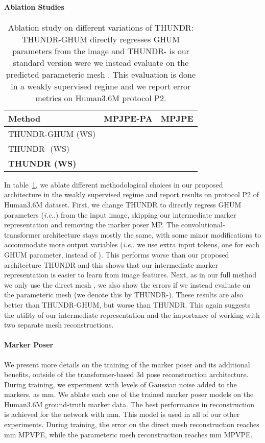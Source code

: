 \documentclass[10pt,twocolumn,letterpaper]{article}
\makeatletter
\DeclareRobustCommand\onedot{\futurelet\@let@token\@onedot}
\def\@onedot{\ifx\@let@token.\else.\null\fi\xspace}
\def\ie{\emph{i.e}\onedot} \def\Ie{\emph{I.e}\onedot}
\makeatother
\begin{document}
\paragraph{Ablation Studies}
\begin{table}[!htbp]
    \small
    \centering
    \begin{tabular}[t]{|l||r|r|}
    \hline
    \textbf{Method}  & {MPJPE-PA} & {MPJPE}\\ 
    \hline
    THUNDR-GHUM (WS) &  &  \\
    \hline
    THUNDR-{} (WS) &  &  \\
    \hline
    \textbf{THUNDR (WS)} &  &  \\
    \hline
    \end{tabular}
    \vspace{-3mm}

    \caption{\small Ablation study on different variations of THUNDR: THUNDR-GHUM directly regresses GHUM parameters from the image and THUNDR-{} is our standard version were we instead evaluate on the predicted parameteric mesh {}. This evaluation is done in a weakly supervised regime and we report error metrics on Human3.6M protocol P2. }
\label{tbl:ablation_ghum}
\end{table}
In table~\ref{tbl:ablation_ghum}, we ablate different methodological choices in our proposed architecture in the weakly supervised regime and report results on protocol P2 of Human3.6M dataset. First, we change THUNDR to directly regress GHUM parameters (\ie ) from the input image, skipping our intermediate marker representation and removing the marker poser MP. The convolutional-transformer architecture stays mostly the same, with some minor modifications to accommodate more output variables (\ie we use  extra input tokens, one for each GHUM parameter, instead of ). This performs worse than our proposed architecture THUNDR and this shows that our intermediate marker representation is easier to learn from image features. Next, as in our full method we only use the direct mesh , we also show the errors if we instead evaluate on the parameteric mesh  (we denote this by THUNDR-). These results are also better than THUNDR-GHUM, but worse than THUNDR. This again suggests the utility of our intermediate representation and the importance of working with two separate mesh reconstructions.

\vspace{-3mm}
\paragraph{Marker Poser}
We present more details on the training of the marker poser and its additional benefits, outside of the transformer-based 3d pose reconstruction architecture. During training, we experiment with  levels of Gaussian noise added to the markers, as  mm. We ablate each one of the trained marker poser models on the Human3.6M ground-truth marker data. The best performance in reconstruction is achieved for the network with  mm. This model is used in all of our other experiments. During training, the error on the direct mesh reconstruction reaches  mm MPVPE, while the parameteric mesh reconstruction reaches  mm MPVPE.
\vspace{-4mm}
\end{document}

